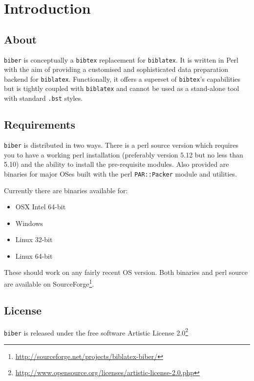 \documentclass{ltxdockit}
\begin{document}
\printtitlepage
\tableofcontents

\section{Introduction}
\label{int}

\subsection{About}

\verb+biber+ is conceptually a \verb+bibtex+ replacement for
\verb+biblatex+. It is written in Perl with the aim of providing a
customised and sophisticated data preparation backend for \verb+biblatex+.
Functionally, it offers a superset of \verb+bibtex+'s capabilities but is
tightly coupled with \verb+biblatex+ and cannot be used as a stand-alone tool
with standard \verb+.bst+ styles.

\subsection{Requirements}\label{ref:req}

\verb+biber+ is distributed in two ways. There is a perl source
version which requires you to have a working perl installation
(preferably version 5.12 but no less than 5.10) and the ability to
install the pre-requisite modules. Also provided are binaries for
major OSes built with the perl \verb+PAR::Packer+ module and utilities.

Currently there are binaries available for:

\begin{itemize}
\item OSX Intel 64-bit
\item Windows
\item Linux 32-bit
\item Linux 64-bit
\end{itemize}

These should work on any fairly recent OS version. Both binaries and
perl source are available on SourceForge\footnote{\url{http://sourceforge.net/projects/biblatex-biber/}}.

\subsection{License}

\verb+biber+ is released under the free software Artistic License 2.0\footnote{\url{http://www.opensource.org/licenses/artistic-license-2.0.php}}
\end{document}
